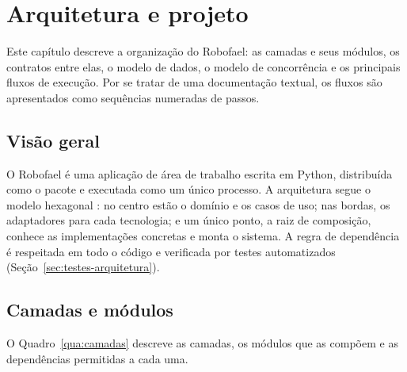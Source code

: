 \chapter{Arquitetura e projeto}

Este capítulo descreve a organização do Robofael: as camadas e seus módulos, os contratos entre elas,
o modelo de dados, o modelo de concorrência e os principais fluxos de execução. Por se tratar de uma
documentação textual, os fluxos são apresentados como sequências numeradas de passos.

\section{Visão geral}

O Robofael é uma aplicação de área de trabalho escrita em Python, distribuída como o pacote
 e executada como um único processo. A arquitetura segue o
modelo hexagonal \cite{cockburn2005}: no centro estão o domínio e os casos de uso; nas bordas, os
adaptadores para cada tecnologia; e um único ponto, a raiz de composição, conhece as implementações
concretas e monta o sistema. A regra de dependência \cite{martin2019} é respeitada em todo o código e
verificada por testes automatizados (Seção~\ref{sec:testes-arquitetura}).

\section{Camadas e módulos}

O Quadro~\ref{qua:camadas} descreve as camadas, os módulos que as compõem e as dependências
permitidas a cada uma.


